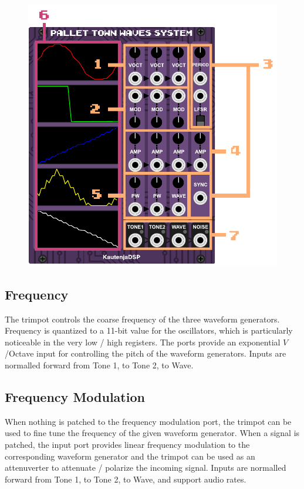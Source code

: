 \documentclass[12pt,letter]{article}
\begin{document}
\begin{figure}[!htp]
\centering
\includegraphics{img/Interface}
\end{figure}

\subsection{Frequency}

The trimpot controls the coarse frequency of the three waveform generators. Frequency is quantized to a 11-bit value for the oscillators, which is particularly noticeable in the very low / high registers. The ports provide an exponential $V$/Octave input for controlling the pitch of the waveform generators. Inputs are normalled forward from Tone 1, to Tone 2, to Wave.

\subsection{Frequency Modulation}

When nothing is patched to the frequency modulation port, the trimpot can be used to fine tune the frequency of the given waveform generator. When a signal is patched, the input port provides linear frequency modulation to the corresponding waveform generator and the trimpot can be used as an attenuverter to attenuate / polarize the incoming signal. Inputs are normalled forward from Tone 1, to Tone 2, to Wave, and support audio rates.
\end{document}
